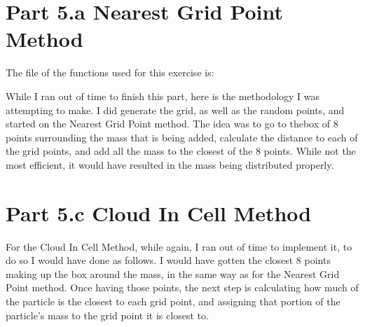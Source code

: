 \section{Part 5.a Nearest Grid Point Method}

The file of the functions used for this exercise is:



While I ran out of time to finish this part, here is the methodology I was attempting to make.
I did generate the grid, as well as the random points, and started on the Nearest Grid Point method. The idea was to
go to thebox of 8 points surrounding the mass that is being added, calculate the distance to each of the grid points, and
add all the mass to the closest of the 8 points. While not the most efficient, it would have resulted in the mass being
distributed properly.

\section{Part 5.c Cloud In Cell Method}

For the Cloud In Cell Method, while again, I ran out of time to implement it, to do so I would have done as follows.
I would have gotten the closest 8 points making up the box around the mass, in the same way as for the Nearest Grid Point method.
Once having those points, the next step is calculating how much of the particle is the closest to each grid point, and assigning that
portion of the particle's mass to the grid point it is closest to.